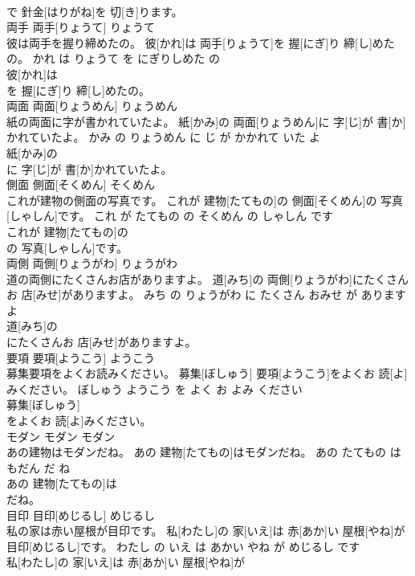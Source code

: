 \documentclass[8pt]{extreport}
\begin{document}
\begin{CJK}{UTF8}{min}
\\	で 針金[はりがね]を 切[き]ります。			
\\	両手	両手[りょうて]	りょうて	
\\	彼は両手を握り締めたの。	彼[かれ]は 両手[りょうて]を 握[にぎ]り 締[し]めたの。	かれ は りょうて を にぎりしめた の	
\\	彼[かれ]は
\\	を 握[にぎ]り 締[し]めたの。			
\\	両面	両面[りょうめん]	りょうめん	
\\	紙の両面に字が書かれていたよ。	紙[かみ]の 両面[りょうめん]に 字[じ]が 書[か]かれていたよ。	かみ の りょうめん に じ が かかれて いた よ	
\\	紙[かみ]の
\\	に 字[じ]が 書[か]かれていたよ。			
\\	側面	側面[そくめん]	そくめん	
\\	これが建物の側面の写真です。	これが 建物[たてもの]の 側面[そくめん]の 写真[しゃしん]です。	これ が たてもの の そくめん の しゃしん です	
\\	これが 建物[たてもの]の
\\	の 写真[しゃしん]です。			
\\	両側	両側[りょうがわ]	りょうがわ	
\\	道の両側にたくさんお店がありますよ。	道[みち]の 両側[りょうがわ]にたくさんお 店[みせ]がありますよ。	みち の りょうがわ に たくさん おみせ が あります よ	
\\	道[みち]の
\\	にたくさんお 店[みせ]がありますよ。			
\\	要項	要項[ようこう]	ようこう	
\\	募集要項をよくお読みください。	募集[ぼしゅう] 要項[ようこう]をよくお 読[よ]みください。	ぼしゅう ようこう を よく お よみ ください	
\\	募集[ぼしゅう]
\\	をよくお 読[よ]みください。			
\\	モダン	モダン	モダン	
\\	あの建物はモダンだね。	あの 建物[たてもの]はモダンだね。	あの たてもの は もだん だ ね	
\\	あの 建物[たてもの]は
\\	だね。			
\\	目印	目印[めじるし]	めじるし	
\\	私の家は赤い屋根が目印です。	私[わたし]の 家[いえ]は 赤[あか]い 屋根[やね]が 目印[めじるし]です。	わたし の いえ は あかい やね が めじるし です	
\\	私[わたし]の 家[いえ]は 赤[あか]い 屋根[やね]が

\end{CJK}
\end{document}
